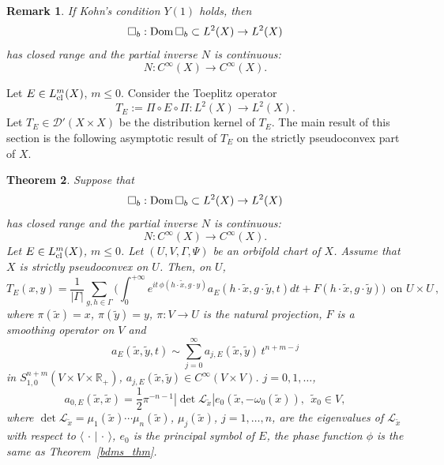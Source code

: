 \documentclass{article}
\newtheorem{theorem}{Theorem}[section]
\newtheorem{remark}[theorem]{Remark}
\newcommand{\mcd}{\mathcal D}
\newcommand{\To}{\rightarrow}
\begin{document}
\begin{remark}\label{r-gue251209yyd}
If Kohn's condition $Y(1)$ holds, then \[\square_b: {\rm Dom\,}\square_b\subset L^2(X)\rightarrow L^2(X)\]
has closed range and the partial inverse $N$ is continuous:
\[N: C^\infty(X)\rightarrow C^\infty(X).\]
\end{remark}

Let $E\in L^m_{{\rm cl\,}}(X)$, $m\leq0$. Consider the Toeplitz operator
\[T_E:=\Pi\circ E\circ\Pi: L^2(X)\To L^2(X).\]
Let $T_E\in\mcd'(X\times X)$ be the distribution kernel of $T_E$. 
The main result of this section is the following asymptotic result of $T_E$ on the strictly pseudoconvex part of $X$.

\begin{theorem}\label{t-gue251209yydf}
Suppose  that \[\square_b: {\rm Dom\,}\square_b\subset L^2(X)\rightarrow L^2(X)\]
has closed range and the partial inverse $N$ is continuous:
\[N: C^\infty(X)\rightarrow C^\infty(X).\]
Let $E\in L^m_{{\rm cl\,}}(X)$, $m\leq0$.
Let $(U, V, \Gamma, \Psi)$
be an orbifold chart of $X$. Assume that $X$ is strictly pseudoconvex on $U$. Then, on $U$, 
		\begin{equation}\label{e-gue251130yydaz}
        T_E(x,y)=\frac{1}{|\Gamma|}\sum_{g,h\in\Gamma}\Bigr(\int _0^{+\infty}e^{it\, \phi(h\cdot\tilde{x},g\cdot y)}a_E(h\cdot\tilde{x},g\cdot \tilde{y},t)dt+F(h\cdot\tilde x,g\cdot\tilde y)\Bigr)\ \ \mbox{on $U\times U$} \,,\end{equation}
		where $\pi(\widetilde x)=x$, $\pi(\widetilde y)=y$, $\pi: V\To U$ is the natural projection, $F$ is a smoothing operator on $V$ and 
		\[a_E( \widetilde{x}, \widetilde{y},t)\sim\sum^\infty_{j=0}a_{j,E}( \widetilde{x},  \widetilde{y})\,t^{n+m-j}\]
		in $S^{n+m}_{1, 0}(V\times V\times\mathbb{R}_+)$,
        $a_{j,E}( \widetilde{x},  \widetilde{y})\in C^\infty(V\times V)$. $j=0,1,\ldots$, 
        \[a_{0,E}(\widetilde{x},  \widetilde{x})=\frac{1}{2}\pi^{-n-1}|\det\mathcal{L}_{\widetilde{x}}|e_0(\widetilde x,-\omega_0(\widetilde x)),\ \ \widetilde{x}_0\in V,\]
        where $\det\mathcal{L}_{\widetilde{x}}=\mu_1(\widetilde x)\cdots\mu_n(\widetilde x)$, $\mu_j(\widetilde x)$, $j=1,\ldots,n$, are the eigenvalues of 
        $\mathcal{L}_{\widetilde{x}}$ with respect to $\langle\,\cdot\,|\,\cdot\,\rangle$, $e_0$ is the principal symbol of $E$, 
		 the phase function $\phi$ is the same as Theorem~\ref{bdms_thm}. 
         

\end{theorem}
\end{document}
